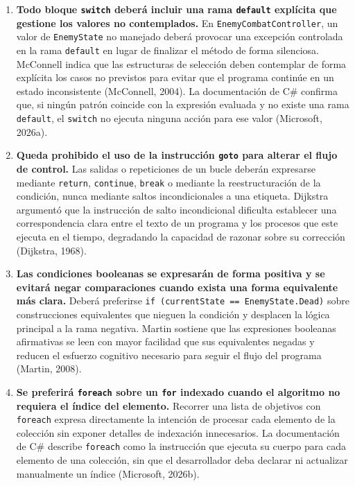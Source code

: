 \begin{enumerate}
  \item \textbf{Todo bloque \texttt{switch} deberá incluir una rama \texttt{default} explícita que gestione los valores no contemplados.} En \texttt{EnemyCombatController}, un valor de \texttt{EnemyState} no manejado deberá provocar una excepción controlada en la rama \texttt{default} en lugar de finalizar el método de forma silenciosa. McConnell indica que las estructuras de selección deben contemplar de forma explícita los casos no previstos para evitar que el programa continúe en un estado inconsistente (McConnell, 2004). La documentación de C\# confirma que, si ningún patrón coincide con la expresión evaluada y no existe una rama \texttt{default}, el \texttt{switch} no ejecuta ninguna acción para ese valor (Microsoft, 2026a).

  \item \textbf{Queda prohibido el uso de la instrucción \texttt{goto} para alterar el flujo de control.} Las salidas o repeticiones de un bucle deberán expresarse mediante \texttt{return}, \texttt{continue}, \texttt{break} o mediante la reestructuración de la condición, nunca mediante saltos incondicionales a una etiqueta. Dijkstra argumentó que la instrucción de salto incondicional dificulta establecer una correspondencia clara entre el texto de un programa y los procesos que este ejecuta en el tiempo, degradando la capacidad de razonar sobre su corrección (Dijkstra, 1968).

  \item \textbf{Las condiciones booleanas se expresarán de forma positiva y se evitará negar comparaciones cuando exista una forma equivalente más clara.} Deberá preferirse \texttt{if (currentState == EnemyState.Dead)} sobre construcciones equivalentes que nieguen la condición y desplacen la lógica principal a la rama negativa. Martin sostiene que las expresiones booleanas afirmativas se leen con mayor facilidad que sus equivalentes negadas y reducen el esfuerzo cognitivo necesario para seguir el flujo del programa (Martin, 2008).

  \item \textbf{Se preferirá \texttt{foreach} sobre un \texttt{for} indexado cuando el algoritmo no requiera el índice del elemento.} Recorrer una lista de objetivos con \texttt{foreach} expresa directamente la intención de procesar cada elemento de la colección sin exponer detalles de indexación innecesarios. La documentación de C\# describe \texttt{foreach} como la instrucción que ejecuta su cuerpo para cada elemento de una colección, sin que el desarrollador deba declarar ni actualizar manualmente un índice (Microsoft, 2026b).


\end{enumerate}
